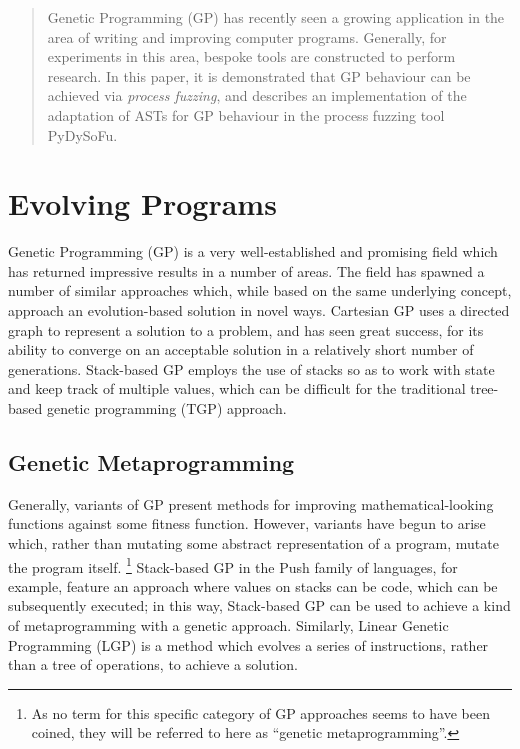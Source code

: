 \documentclass[draft,12pt]{llncs}   %
\begin{document}
\maketitle

\begin{abstract}
  Genetic Programming (GP) has recently seen a growing application in the area
  of writing and improving computer programs. Generally, for experiments in this
  area, bespoke tools are constructed to perform research. In this paper, it is
  demonstrated that GP behaviour can be achieved via \emph{process fuzzing}, and
  describes an implementation of the adaptation of ASTs for GP behaviour in the
  process fuzzing tool PyDySoFu.
\end{abstract}


\section{Evolving Programs}
Genetic Programming (GP) is a very well-established and promising field which
has returned impressive results in a number of areas. The field has spawned a
number of similar approaches which, while based on the same underlying concept,
approach an evolution-based solution in novel ways. Cartesian
GP\cite{miller2011cartesian} uses a directed graph to
represent a solution to a problem, and has seen great success, for its ability
to converge on an acceptable solution in a relatively short number of
generations. Stack-based GP\cite{perkis1994stack} employs the use of stacks so
as to work with state and keep track of multiple values, which can be difficult
for the traditional tree-based genetic programming (TGP) approach.\par

\subsection{Genetic Metaprogramming}
Generally, variants of GP present methods for improving mathematical-looking
functions against some fitness function. However, variants have begun to arise
which, rather than mutating some abstract representation of a program, mutate
the program itself. \footnote{As no term for this specific category of GP
  approaches seems to have been coined, they will be referred to here as
  ``genetic metaprogramming''.} Stack-based GP in the Push family of
languages\cite{spector2001autoconstructive}, for example, feature an approach
where values on stacks can be code, which can be subsequently executed; in this
way, Stack-based GP can be used to achieve a kind of metaprogramming with a
genetic approach. Similarly, Linear Genetic Programming\cite{brameier2007linear}
(LGP) is a method which evolves a series of instructions, rather than a tree of
operations, to achieve a solution.\par
\end{document}
